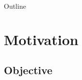 \date[February, 2013] %
{Presentation , 2013}

\subject{N-adic numbers course}








\begin{frame}
  \titlepage
\end{frame}

\begin{frame}{Outline}
  \tableofcontents
\end{frame}





\section{Motivation}

\subsection{Objective}

